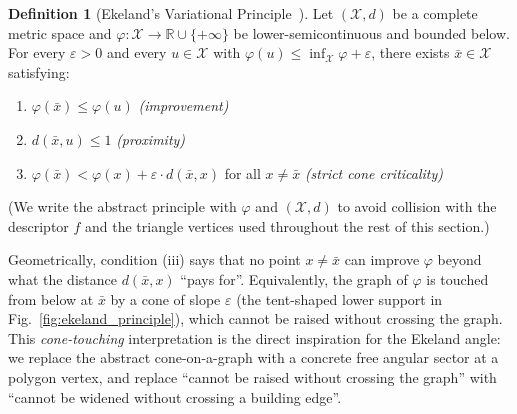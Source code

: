 \documentclass[10pt]{article}
\theoremstyle{plain}
\theoremstyle{definition}
\newtheorem{definition}[theorem]{Definition}
\begin{document}
\begin{definition}[Ekeland's Variational Principle~\cite{ekeland1974}]
\label{def:ekeland}
Let $(\mathcal{X},d)$ be a complete metric space and
$\varphi: \mathcal{X} \to \mathbb{R} \cup \{+\infty\}$ be lower-semicontinuous
and bounded below.
For every $\varepsilon > 0$ and every $u \in \mathcal{X}$ with
$\varphi(u) \le \inf_{\mathcal{X}} \varphi + \varepsilon$, there exists
$\bar{x} \in \mathcal{X}$ satisfying:
\begin{enumerate}[label=(\roman*)]
  \item $\varphi(\bar{x}) \le \varphi(u)$ \hfill\emph{(improvement)}
  \item $d(\bar{x},u) \le 1$ \hfill\emph{(proximity)}
  \item $\varphi(\bar{x}) < \varphi(x) + \varepsilon \cdot d(\bar{x},x)$
        \;for all $x \ne \bar{x}$
        \hfill\emph{(strict cone criticality)}
\end{enumerate}
\end{definition}
\noindent(We write the abstract principle with $\varphi$ and $(\mathcal{X},d)$
to avoid collision with the descriptor $f$ and the triangle vertices used
throughout the rest of this section.)

Geometrically, condition (iii) says that no point $x \ne \bar{x}$ can improve
$\varphi$ beyond what the distance $d(\bar{x},x)$ ``pays for''.
Equivalently, the graph of $\varphi$ is touched from below at $\bar{x}$ by a
cone of slope $\varepsilon$ (the tent-shaped lower support in
Fig.~\ref{fig:ekeland_principle}), which cannot be raised without crossing the
graph.
This \emph{cone-touching} interpretation is the direct inspiration for the
Ekeland angle: we replace the abstract cone-on-a-graph with a concrete free
angular sector at a polygon vertex, and replace ``cannot be raised without
crossing the graph'' with ``cannot be widened without crossing a building
edge''.
\end{document}
